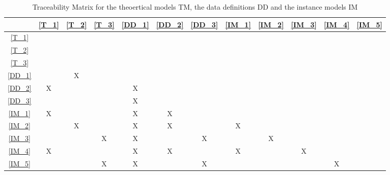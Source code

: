 \documentclass[12pt]{article}
\begin{document}
\begin{table}[H]
\centering
\begin{tabular}{|c|c|c|c|c|c|c|c|c|c|c|c|}
\hline
	& \cref{T_1} & \cref{T_2} & \cref{T_3} & \cref{DD_1} & \cref{DD_2} & \cref{DD_3} & \cref{IM_1} & \cref{IM_2} & \cref{IM_3} & \cref{IM_4} & \cref{IM_5} \\
\hline
\cref{T_1}			& \cellcolor{gray!25} & & & & & & & & & & \\ \hline
\cref{T_2}			& & \cellcolor{gray!25} & & & & & & & & & \\ \hline
\cref{T_3}			& & & \cellcolor{gray!25} & & & & & & & & \\ \hline
\cref{DD_1}			& & X & & \cellcolor{gray!25} & & & & & & & \\ \hline
\cref{DD_2}			& X & & & X & \cellcolor{gray!25} & & & & & & \\ \hline
\cref{DD_3}			& & & & X & & \cellcolor{gray!25} & & & & & \\ \hline
\cref{IM_1}			& X & & & X & X & & \cellcolor{gray!25} & & & & \\ \hline
\cref{IM_2}			& & X & & X & X & & X & \cellcolor{gray!25} & & & \\ \hline
\cref{IM_3}			& & & X & X & & X & & X & \cellcolor{gray!25} & & \\ \hline
\cref{IM_4}			& X & & & X & X & & X & & X & \cellcolor{gray!25} & \\ \hline
\cref{IM_5}			& & & X & X & & X & & & & X & \cellcolor{gray!25} \\ \hline
\end{tabular}
\caption{Traceability Matrix for the theoertical models TM, the data definitions DD and the instance models IM}\label{tb:Matrix_1}
\end{table}

\end{document}
